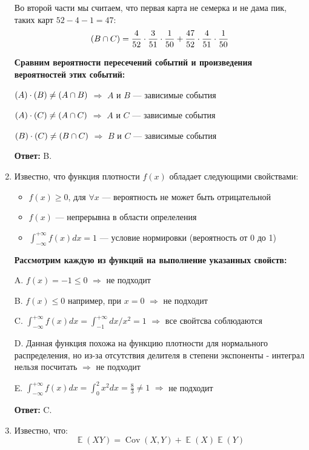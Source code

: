 \documentclass[a4paper]{article} %
\DeclareMathOperator{\Cov}{Cov}
\DeclareMathOperator{\E}{\mathbb{E}}
\let\P\relax
\DeclareMathOperator{\P}{\mathbb{P}}
\renewcommand{\le}{\leqslant}
\renewcommand{\ge}{\geqslant}
\begin{document}
\begin{enumerate}
    Во второй части мы считаем, что первая карта не семерка и не дама пик, таких карт $52-4-1=47$:
    \[
    \P(B \cap C) = \frac{4}{52}\cdot\frac{3}{51}\cdot\frac{1}{50} + \frac{47}{52}\cdot\frac{4}{51}\cdot\frac{1}{50}
    \] 
    
    \textbf{Сравним вероятности пересечений событий и произведения вероятностей этих событий:}
    
    $ \P(A) \cdot \P(B) \neq \P(A \cap B) $ $\Rightarrow$ $A$ и $B$ — зависимые события
    
    $ \P(A) \cdot \P(C) \neq \P(A \cap C) $ $\Rightarrow$ $A$ и $C$ — зависимые события
    
    $ \P(B) \cdot \P(C) \neq \P(B \cap C) $ $\Rightarrow$ $B$ и $C$ — зависимые события
    
    \textbf{Ответ:} B.
    
    
    \item
    Известно, что функция плотности $f(x)$ обладает следующими свойствами:
    \begin{itemize}
        \item $f(x) \ge 0$, для $ \forall x$ — вероятность не может быть отрицательной
        \item $f(x)$ — непрерывна в области опрелеления
        \item $ \int_{-\infty}^{+\infty} f(x) dx = 1$ — условие нормировки (вероятность от 0 до 1)
    \end{itemize}
    
    \textbf{Рассмотрим каждую из функций на выполнение указанных свойств:}
    
    A. $f(x) = -1 \le 0$ $\Rightarrow$ не подходит
    
    B. $f(x) \le 0$ например, при $x = 0$ $\Rightarrow$ не подходит
    
    C. $ \int_{-\infty}^{+\infty} f(x) dx = \int_{-1}^{+\infty} dx/x^2 = 1 $ $\Rightarrow$ все свойтсва соблюдаются
    
    D. Данная функция похожа на функцию плотности для нормального распределения, но из-за отсутствия делителя в степени экспоненты - интеграл нельзя посчитать $\Rightarrow$ не подходит
    
    E. $ \int_{-\infty}^{+\infty} f(x) dx = \int_{0}^{2} x^2 dx = \frac{8}{3} \neq 1 $ $\Rightarrow$ не подходит
    
    \textbf{Ответ:} C.
    
    
    \item
    Известно, что:
    \[
    \E(XY) = \Cov(X,Y) + \E(X)\E(Y)
    \]
    

\end{enumerate}
\end{document}
